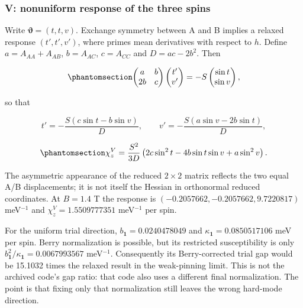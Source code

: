 \subsubsection{V: nonuniform response of the three
spins}\label{v-nonuniform-response-of-the-three-spins}

Write \(\boldsymbol\vartheta=(t,t,v)\). Exchange symmetry between A and
B implies a relaxed response \((t',t',v')\), where primes mean
derivatives with respect to \(h\). Define \(a=A_{AA}+A_{AB}\),
\(b=A_{AC}\), \(c=A_{CC}\) and \(D=ac-2b^2\). Then

\begin{equation}\phantomsection\label{eq-lswt-yv-pg-v-system}{
\begin{pmatrix}a&b\\2b&c\end{pmatrix}
\begin{pmatrix}t'\\v'\end{pmatrix}
=-S\begin{pmatrix}\sin t\\\sin v\end{pmatrix},
}\end{equation}

so that

\[
t'=-\frac{S(c\sin t-b\sin v)}{D},
\qquad
v'=-\frac{S(a\sin v-2b\sin t)}{D},
\]

\begin{equation}\phantomsection\label{eq-lswt-yv-pg-v-response}{
\chi_z^{V}=
\frac{S^2}{3D}
\left(2c\sin^2t-4b\sin t\sin v+a\sin^2v\right).
}\end{equation}

The asymmetric appearance of the reduced \(2\times2\) matrix reflects
the two equal A/B displacements; it is not itself the Hessian in
orthonormal reduced coordinates. At \(B=1.4\) T the response is
\((-0.2057662,-0.2057662,9.7220817)\) meV\(^{-1}\) and
\(\chi_z^{V}=1.5509777351\) meV\(^{-1}\) per spin.

For the uniform trial direction, \(b_{\mathbf 1}=0.0240478049\) and
\(\kappa_{\mathbf 1}=0.0850517106\) meV per spin. Berry normalization is
possible, but its restricted susceptibility is only
\(b_{\mathbf 1}^2/\kappa_{\mathbf 1}=0.0067993567\) meV\(^{-1}\).
Consequently its Berry-corrected trial gap would be 15.1032 times the
relaxed result in the weak-pinning limit. This is not the archived
code's gap ratio: that code also uses a different final normalization.
The point is that fixing only that normalization still leaves the wrong
hard-mode direction.

